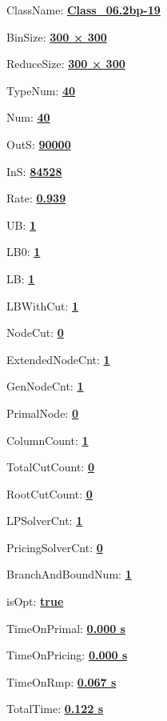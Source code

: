 \documentclass[11pt]{article}
\begin{document}
\pagestyle{empty}


ClassName: \underline{\textbf{Class_06.2bp-19}}
\par
BinSize: \underline{\textbf{300 × 300}}
\par
ReduceSize: \underline{\textbf{300 × 300}}
\par
TypeNum: \underline{\textbf{40}}
\par
Num: \underline{\textbf{40}}
\par
OutS: \underline{\textbf{90000}}
\par
InS: \underline{\textbf{84528}}
\par
Rate: \underline{\textbf{0.939}}
\par
UB: \underline{\textbf{1}}
\par
LB0: \underline{\textbf{1}}
\par
LB: \underline{\textbf{1}}
\par
LBWithCut: \underline{\textbf{1}}
\par
NodeCut: \underline{\textbf{0}}
\par
ExtendedNodeCnt: \underline{\textbf{1}}
\par
GenNodeCnt: \underline{\textbf{1}}
\par
PrimalNode: \underline{\textbf{0}}
\par
ColumnCount: \underline{\textbf{1}}
\par
TotalCutCount: \underline{\textbf{0}}
\par
RootCutCount: \underline{\textbf{0}}
\par
LPSolverCnt: \underline{\textbf{1}}
\par
PricingSolverCnt: \underline{\textbf{0}}
\par
BranchAndBoundNum: \underline{\textbf{1}}
\par
isOpt: \underline{\textbf{true}}
\par
TimeOnPrimal: \underline{\textbf{0.000 s}}
\par
TimeOnPricing: \underline{\textbf{0.000 s}}
\par
TimeOnRmp: \underline{\textbf{0.067 s}}
\par
TotalTime: \underline{\textbf{0.122 s}}
\par
\newpage
\end{document}

